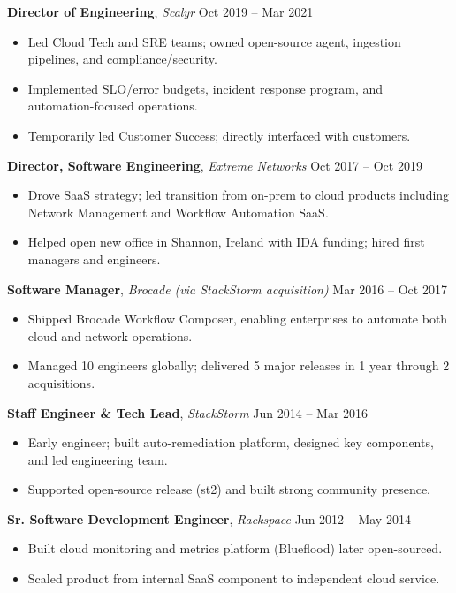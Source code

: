 \documentclass[9pt]{article}
\newenvironment{changemargin}[2]{%
  \begin{list}{}{%
    \setlength{\topsep}{0pt}%
    \setlength{\leftmargin}{#1}%
    \setlength{\rightmargin}{#2}%
    \setlength{\listparindent}{\parindent}%
    \setlength{\itemindent}{\parindent}%
    \setlength{\parsep}{\parskip}%
  }%
  \item[]}{\end{list}
}
\newenvironment{body} {
        \vspace*{-16pt}
        \begin{changemargin}{-0.25in}{-0.5in}
  }
        {\end{changemargin}
}
\begin{document}
\begin{body}
\textbf{Director of Engineering}, \emph{Scalyr} \hfill Oct 2019 -- Mar 2021 \\
\begin{itemize}
  \item Led Cloud Tech and SRE teams; owned open-source agent, ingestion pipelines, and compliance/security.
  \item Implemented SLO/error budgets, incident response program, and automation-focused operations.
  \item Temporarily led Customer Success; directly interfaced with customers.
\end{itemize}

\textbf{Director, Software Engineering}, \emph{Extreme Networks} \hfill Oct 2017 -- Oct 2019 \\
\begin{itemize}
  \item Drove SaaS strategy; led transition from on-prem to cloud products including Network Management and Workflow Automation SaaS.
  \item Helped open new office in Shannon, Ireland with IDA funding; hired first managers and engineers.
\end{itemize}

\textbf{Software Manager}, \emph{Brocade (via StackStorm acquisition)} \hfill Mar 2016 -- Oct 2017 \\
\begin{itemize}
  \item Shipped Brocade Workflow Composer, enabling enterprises to automate both cloud and network operations.
  \item Managed 10 engineers globally; delivered 5 major releases in 1 year through 2 acquisitions.
\end{itemize}

\textbf{Staff Engineer \& Tech Lead}, \emph{StackStorm} \hfill Jun 2014 -- Mar 2016 \\
\begin{itemize}
  \item Early engineer; built auto-remediation platform, designed key components, and led engineering team.
  \item Supported open-source release (st2) and built strong community presence.
\end{itemize}

\textbf{Sr. Software Development Engineer}, \emph{Rackspace} \hfill Jun 2012 -- May 2014 \\
\begin{itemize}
  \item Built cloud monitoring and metrics platform (Blueflood) later open-sourced.
  \item Scaled product from internal SaaS component to independent cloud service.
\end{itemize}


\end{body}
\end{document}

